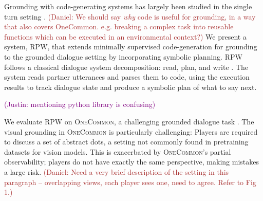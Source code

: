\documentclass[11pt]{article}
\newcommand{\system}{RPW}
\newcommand{\justin}[1]{{{\textcolor{purple}{(Justin: #1)}}}}
\newcommand{\wenting}[1]{{{\textcolor{orange}{(Wenting: #1)}}}}
\newcommand{\daniel}[1]{{{\textcolor{brown}{(Daniel: #1)}}}}
\begin{document}
Grounding with code-generating systems has largely been studied in the single turn setting \citep{vipergpt,codeaspolicies2022}.
\daniel{We should say \emph{why} code is useful for grounding, in a way that also covers OneCommon. e.g. breaking a complex task into reusable functions which can be executed in an environmental context?}
We present a system, \system{}, that extends minimally supervised code-generation for grounding
to the grounded dialogue setting by incorporating symbolic planning.
\system{} follows a classical dialogue system decomposition:
read, plan, and write \citep{young2013pomdpsurvey}.
The system reads partner utterances and parses them to code,
using the execution results to track dialogue state and produce a symbolic plan of what to say next.

\justin{mentioning python library is confusing}

We evaluate \system{} on \textsc{OneCommon}, a challenging grounded dialogue task \citep{onecommon}.
The visual grounding in \textsc{OneCommon} is particularly challenging:
Players are required to discuss a set of abstract dots, a setting not commonly found in
pretraining datasets for vision models.
This is exacerbated by \textsc{OneCommon}'s partial observability;
players do not have exactly the same perspective, making mistakes a large risk.
\daniel{Need a very brief description of the setting in this paragraph -- overlapping views, each player sees one, need to agree. Refer to Fig 1.}
\end{document}
